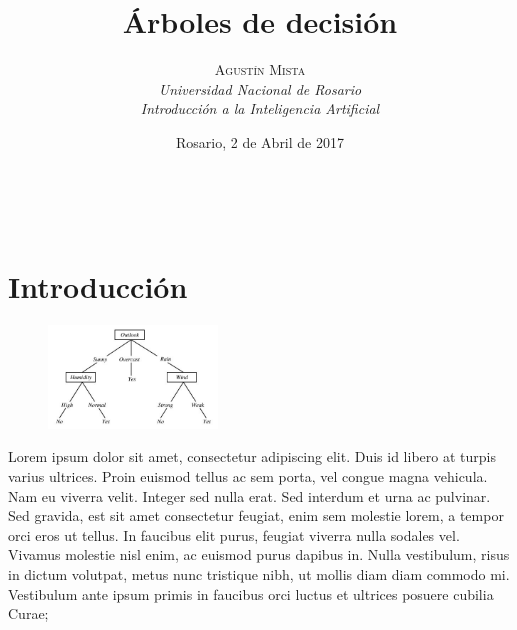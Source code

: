 \documentclass[a4paper, 11pt]{article} %
\title{\textbf{Árboles de decisión}}
\author{
	\textsc{Agustín Mista}\\
	\textit{Universidad Nacional de Rosario}\\
 	\textit{Introducción a la Inteligencia Artificial}
}
\date{Rosario, 2 de Abril de 2017}
\makeatletter
\renewcommand{\maketitle}{ %
\begin{flushright} %
{\LARGE\@title} %

\vspace{50pt} %

{\large\@author} %
\\\@date %

\vspace{40pt} %
\end{flushright}
}
\makeatother
\begin{document}
\maketitle %




\vspace{20pt} %


\section*{Introducción}

\begin{figure}
	\begin{center}
		\vspace{-20pt}
		\includegraphics[width=0.4\textwidth]{play-tennis.jpg}
		\vspace{-20pt}
	\end{center}
\end{figure}

Lorem ipsum dolor sit amet, consectetur adipiscing elit. Duis id libero at
turpis varius ultrices. Proin euismod tellus ac sem porta, vel congue magna
vehicula. Nam eu viverra velit. Integer sed nulla erat. Sed interdum et urna ac
pulvinar. Sed gravida, est sit amet consectetur feugiat, enim sem molestie
lorem, a tempor orci eros ut tellus. In faucibus elit purus, feugiat viverra
nulla sodales vel. Vivamus molestie nisl enim, ac euismod purus dapibus in.
Nulla vestibulum, risus in dictum volutpat, metus nunc tristique nibh, ut
mollis diam diam commodo mi. Vestibulum ante ipsum primis in faucibus orci
luctus et ultrices posuere cubilia Curae; 
\end{document}

